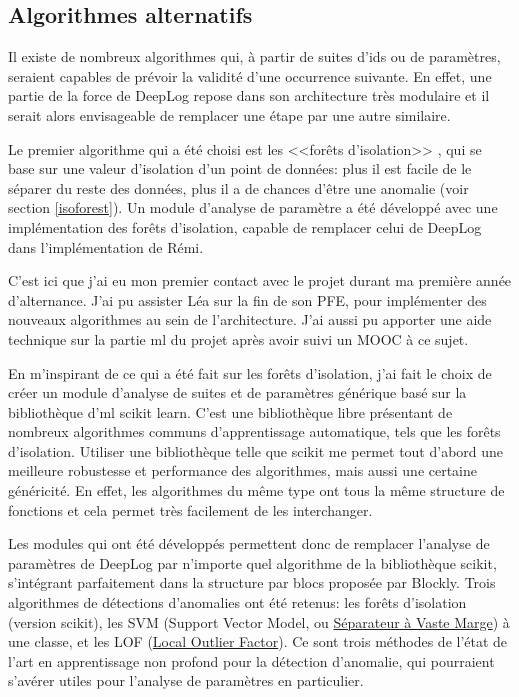 \documentclass[openany, 11pt]{memoir}
\begin{document}
\subsection{Algorithmes alternatifs}

Il existe de nombreux algorithmes qui, à partir de suites d'ids ou de paramètres, seraient capables de prévoir la validité d'une occurrence suivante. En effet, une partie de la force de DeepLog repose dans son architecture très modulaire et il serait alors envisageable de remplacer une étape par une autre similaire.

Le premier algorithme qui a été choisi est les <<forêts d'isolation>> \cite{isolationforest}, qui se base sur une valeur d'isolation d'un point de données: plus il est facile de le séparer du reste des données, plus il a de chances d'être une anomalie (voir section \ref{isoforest}). Un module d'analyse de paramètre a été développé avec une implémentation des forêts d'isolation, capable de remplacer celui de DeepLog dans l'implémentation de Rémi.

\bigskip
C'est ici que j'ai eu mon premier contact avec le projet durant ma première année d'alternance. J'ai pu assister Léa sur la fin de son PFE, pour implémenter des nouveaux algorithmes au sein de l'architecture. J'ai aussi pu apporter une aide technique sur la partie \gls{ml} du projet après avoir suivi un MOOC à ce sujet.

En m'inspirant de ce qui a été fait sur les forêts d'isolation, j'ai fait le choix de créer un module d'analyse de suites et de paramètres générique basé sur la bibliothèque d'\gls{ml} scikit learn. C'est une bibliothèque libre présentant de nombreux algorithmes communs d'apprentissage automatique, tels que les forêts d'isolation. Utiliser une bibliothèque telle que scikit me permet tout d'abord une meilleure robustesse et performance des algorithmes, mais aussi une certaine généricité. En effet, les algorithmes du même type ont tous la même structure de fonctions et cela permet très facilement de les interchanger.

Les modules qui ont été développés permettent donc de remplacer l'analyse de paramètres de DeepLog par n'importe quel algorithme de la bibliothèque scikit, s'intégrant parfaitement dans la structure par blocs proposée par Blockly. Trois algorithmes de détections d'anomalies ont été retenus: les forêts d'isolation (version scikit), les SVM (Support Vector Model, ou \href{https://fr.wikipedia.org/wiki/Machine_à_vecteurs_de_support}{Séparateur à Vaste Marge}) à une classe, et les LOF (\href{https://en.wikipedia.org/wiki/Local_outlier_factor}{Local Outlier Factor}). Ce sont trois méthodes de l'état de l'art en apprentissage non profond pour la détection d'anomalie, qui pourraient s'avérer utiles pour l'analyse de paramètres en particulier.
\end{document}
